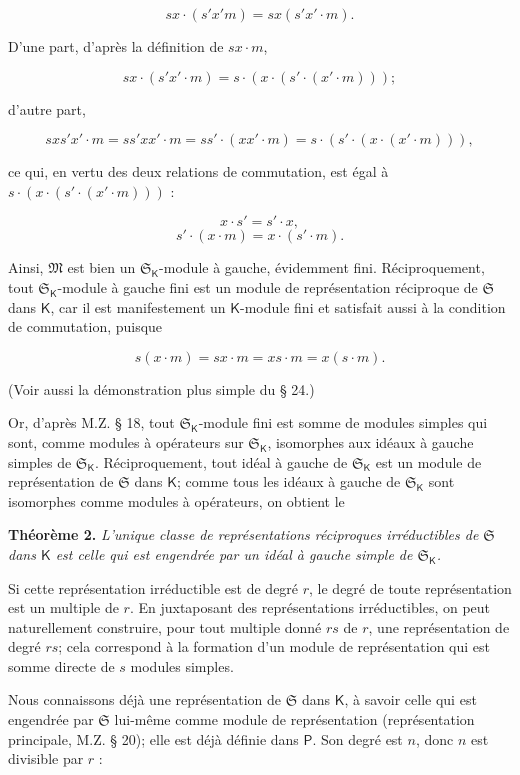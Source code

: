 \[
sx\cdot(s'x' m)=sx(s'x'\cdot m).
\]

D'une part, d'après la définition de \(sx\cdot m\),

\[
sx\cdot(s'x'\cdot m)=s\cdot(x\cdot(s'\cdot(x'\cdot m)));
\]

d'autre part,

\[
sx s'x'\cdot m=ss'xx'\cdot m=ss'\cdot(xx'\cdot m)
=s\cdot(s'\cdot(x\cdot(x'\cdot m))),
\]

ce qui, en vertu des deux relations de commutation, est égal à \(s\cdot(x\cdot(s'\cdot(x'\cdot m)))\) :

\[
x\cdot s'=s'\cdot x,
\]
\[
s'\cdot(x\cdot m)=x\cdot(s'\cdot m).
\]

Ainsi, \(\mathfrak M\) est bien un \(\mathfrak S_{\mathsf K}\)-module à gauche, évidemment fini. Réciproquement, tout \(\mathfrak S_{\mathsf K}\)-module à gauche fini est un module de représentation réciproque de \(\mathfrak S\) dans \(\mathsf K\), car il est manifestement un \(\mathsf K\)-module fini et satisfait aussi à la condition de commutation, puisque

\[
s(x\cdot m)=sx\cdot m=xs\cdot m=x(s\cdot m).
\]

(Voir aussi la démonstration plus simple du \S{} 24.)

Or, d'après M.Z. \S{} 18, tout \(\mathfrak S_{\mathsf K}\)-module fini est somme de modules simples qui sont, comme modules à opérateurs sur \(\mathfrak S_{\mathsf K}\), isomorphes aux idéaux à gauche simples de \(\mathfrak S_{\mathsf K}\). Réciproquement, tout idéal à gauche de \(\mathfrak S_{\mathsf K}\) est un module de représentation de \(\mathfrak S\) dans \(\mathsf K\); comme tous les idéaux à gauche de \(\mathfrak S_{\mathsf K}\) sont isomorphes comme modules à opérateurs, on obtient le

\textbf{Théorème 2.} \emph{L'unique classe de représentations réciproques irréductibles de \(\mathfrak S\) dans \(\mathsf K\) est celle qui est engendrée par un idéal à gauche simple de \(\mathfrak S_{\mathsf K}\).}

Si cette représentation irréductible est de degré \(r\), le degré de toute représentation est un multiple de \(r\). En juxtaposant des représentations irréductibles, on peut naturellement construire, pour tout multiple donné \(rs\) de \(r\), une représentation de degré \(rs\); cela correspond à la formation d'un module de représentation qui est somme directe de \(s\) modules simples.

Nous connaissons déjà une représentation de \(\mathfrak S\) dans \(\mathsf K\), à savoir celle qui est engendrée par \(\mathfrak S\) lui-même comme module de représentation (représentation principale, M.Z. \S{} 20); elle est déjà définie dans \(\mathsf P\). Son degré est \(n\), donc \(n\) est divisible par \(r\) :

